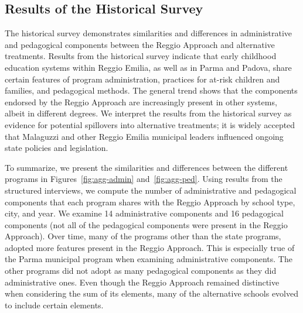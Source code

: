 \subsection{Results of the Historical Survey}

The historical survey demonstrates similarities and differences in administrative and pedagogical components between the Reggio Approach and alternative treatments. Results from the historical survey indicate that early childhood education systems within Reggio Emilia, as well as in Parma and Padova, share certain features of program administration, practices for at-risk children and families, and pedagogical methods. The general trend shows that the components endorsed by the Reggio Approach are increasingly present in other systems, albeit in different degrees. We interpret the results from the historical survey as evidence for potential spillovers into alternative treatments; it is widely accepted that Malaguzzi and other Reggio Emilia municipal leaders influenced ongoing state policies and legislation. 



To summarize, we present the similarities and differences between the different programs in Figures~\ref{fig:agg-admin} and~\ref{fig:agg-ped}. Using results from the structured interviews, we compute the number of administrative and pedagogical components that each program shares with the Reggio Approach by school type, city, and year. We examine 14 administrative components and 16 pedagogical components (not all of the pedagogical components were present in the Reggio Approach). Over time, many of the programs other than the state programs, adopted more features present in the Reggio Approach. This is especially true of the Parma municipal program when examining administrative components. The other programs did not adopt as many pedagogical components as they did administrative ones. Even though the Reggio Approach remained distinctive when considering the sum of its elements, many of the alternative schools evolved to include certain elements.

